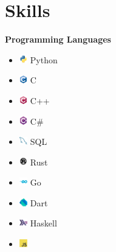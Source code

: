 \documentclass{article}
\begin{document}
\section*{Skills}
\begin{multicols}{3}
\raggedcolumns
\textbf{Programming Languages}
\begin{itemize}
    \item \includegraphics[height=10pt]{images/icons/python.png}
    Python
    \item \includegraphics[height=10pt]{images/icons/c.png}
    C
    \item \includegraphics[height=10pt]{images/icons/cpp.png}
    C++
    \item \includegraphics[height=10pt]{images/icons/csharp.png}
    C\#
    \item \includegraphics[height=10pt]{images/icons/mysql-original.png}
    SQL
    \item \includegraphics[height=10pt]{images/icons/rust-plain.png}
    Rust
    \item \includegraphics[height=10pt]{images/icons/go-original-wordmark.png}
    Go
    \item \includegraphics[height=10pt]{images/icons/dart.png}
    Dart
    \item \includegraphics[height=10pt]{images/icons/haskell-original.png}
    Haskell
    \item \includegraphics[height=10pt]{images/icons/javascript-original}

\end{itemize}
\end{multicols}
\end{document}
